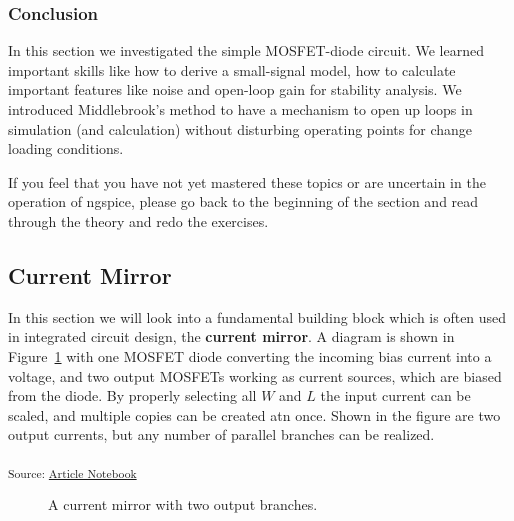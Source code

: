 \documentclass[
  a4paper,
  DIV=11,
  numbers=noendperiod]{scrartcl}
\begin{document}
\subsubsection{Conclusion}\label{conclusion-1}

In this section we investigated the simple MOSFET-diode circuit. We
learned important skills like how to derive a small-signal model, how to
calculate important features like noise and open-loop gain for stability
analysis. We introduced Middlebrook's method to have a mechanism to open
up loops in simulation (and calculation) without disturbing operating
points for change loading conditions.

If you feel that you have not yet mastered these topics or are uncertain
in the operation of ngspice, please go back to the beginning of the
section and read through the theory and redo the exercises.

\subsection{Current Mirror}\label{sec-current-mirror}

In this section we will look into a fundamental building block which is
often used in integrated circuit design, the \textbf{current mirror}. A
diagram is shown in Figure~\ref{fig-current-mirror} with one MOSFET
diode converting the incoming bias current into a voltage, and two
output MOSFETs working as current sources, which are biased from the
diode. By properly selecting all \(W\) and \(L\) the input current can
be scaled, and multiple copies can be created atn once. Shown in the
figure are two output currents, but any number of parallel branches can
be realized.

\textsubscript{Source:
\href{https://iic-jku.github.io/analog-circuit-design/index.qmd.html}{Article
Notebook}}

\begin{figure}[H]


\caption{\label{fig-current-mirror}A current mirror with two output
branches.}

\end{figure}%
\end{document}
